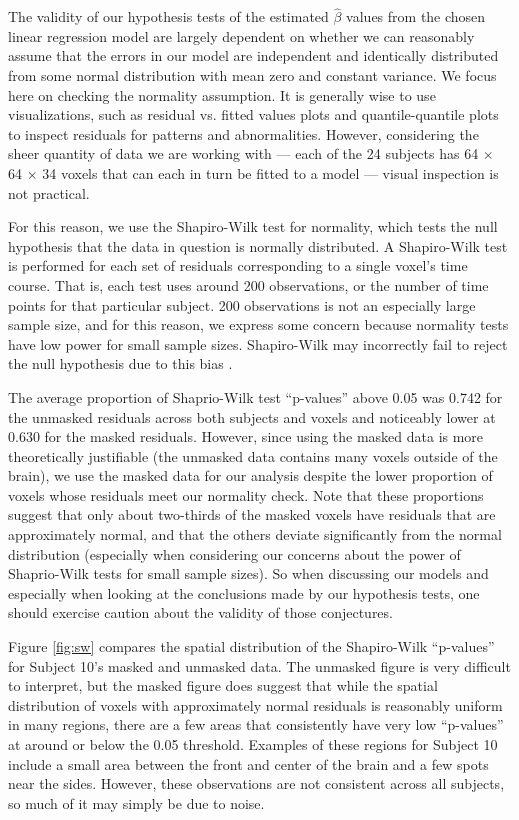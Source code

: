 \par \indent The validity of our hypothesis tests of the estimated 
$\hat{\beta}$ values from the chosen linear regression model are largely 
dependent on whether we can reasonably assume that the errors in our model 
are independent and identically distributed from some normal distribution 
with mean zero and constant variance. We focus here on checking the normality 
assumption. It is generally wise to use visualizations, such as residual vs. 
fitted values plots and quantile-quantile plots to inspect residuals for 
patterns and abnormalities. However, considering the sheer quantity of data 
we are working with --- each of the 24 subjects has 64 $\times$ 64 $\times$ 34 
voxels that can each in turn be fitted to a model --- visual inspection is 
not practical. 

For this reason, we use the Shapiro-Wilk test for normality, 
which tests the null hypothesis that the data in question is normally 
distributed. A Shapiro-Wilk test is performed for each set of residuals 
corresponding to a single voxel's time course. That is, each test uses around 
200 observations, or the number of time points for that particular subject. 
200 observations is not an especially large sample size, and for this reason, 
we express some concern because normality tests have low power for small 
sample sizes. Shapiro-Wilk may incorrectly fail to reject the null hypothesis 
due to this bias \cite{ghasemi2012normality}. 

The average proportion of Shaprio-Wilk test ``p-values'' above 0.05 was 0.742 
for the unmasked residuals across both subjects and voxels and noticeably 
lower at 0.630 for the masked residuals. However, since using the masked data 
is more theoretically justifiable (the unmasked data contains many voxels 
outside of the brain), we use the masked data for our analysis despite the 
lower proportion of voxels whose residuals meet our normality check. Note that 
these proportions suggest that only about two-thirds of the masked voxels have 
residuals that are approximately normal, and that the others deviate 
significantly from the normal distribution (especially when considering our 
concerns about the power of Shaprio-Wilk tests for small sample sizes). So when 
discussing our models and especially when looking at the conclusions made by 
our hypothesis tests, one should exercise caution about the validity of those 
conjectures. 

Figure \ref{fig:sw} compares the spatial distribution of the Shapiro-Wilk 
``p-values'' for Subject 10's masked and unmasked data. The unmasked figure 
is very difficult to interpret, but the masked figure does suggest that while 
the spatial distribution of voxels with approximately normal residuals is 
reasonably uniform in many regions, there are a few areas that consistently 
have very low ``p-values'' at around or below the 0.05 threshold. Examples of 
these regions for Subject 10 include a small area between the front and center 
of the brain and a few spots near the sides. However, these observations are 
not consistent across all subjects, so much of it may simply be due to 
noise. 

